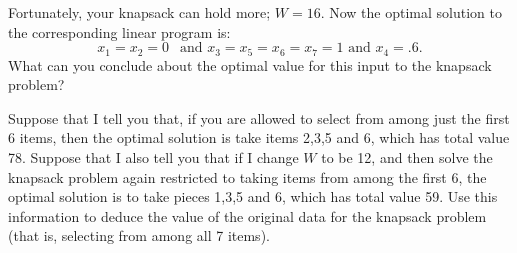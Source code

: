 \documentclass[twoside]{article}%
\begin{document}
\vspace{1in}
\noindent
Fortunately, your knapsack can hold more; $W=16$.
Now the optimal solution to the corresponding linear program is:
$$ x_1 = x_2 = 0  \ \ \text{ and } x_3 = x_5 = x_6 =x_ 7 =1 \text{ and } x_4 = .6 .$$
What can you conclude about the optimal value for this input to the knapsack problem?

\vspace{1in}

\noindent
Suppose that I tell you that, if you are allowed to select from
among just the first 6 items, then the optimal solution is take items 2,3,5 and 6,
which has total value 78. Suppose that I also tell you that if I change
$W$ to be 12, and then solve the knapsack problem again restricted to
taking items from among the first 6, the optimal solution is to take
pieces 1,3,5 and 6, which has total value 59. Use this information to deduce
the value of the original data for the knapsack problem (that is, selecting
from among all 7 items).
\end{document}
